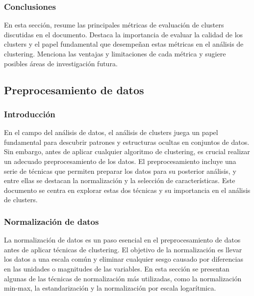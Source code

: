 \documentclass{article}
\begin{document}
\subsubsection*{Conclusiones}
En esta sección, resume las principales métricas de evaluación de clusters discutidas en el documento. Destaca la importancia de evaluar la calidad de los clusters y el papel fundamental que desempeñan estas métricas en el análisis de clustering. Menciona las ventajas y limitaciones de cada métrica y sugiere posibles áreas de investigación futura.

\subsection{Preprocesamiento de datos}

\subsubsection{Introducción}
En el campo del análisis de datos, el análisis de clusters juega un papel fundamental para descubrir patrones y estructuras ocultas en conjuntos de datos. Sin embargo, antes de aplicar cualquier algoritmo de clustering, es crucial realizar un adecuado preprocesamiento de los datos. El preprocesamiento incluye una serie de técnicas que permiten preparar los datos para su posterior análisis, y entre ellas se destacan la normalización y la selección de características. Este documento se centra en explorar estas dos técnicas y su importancia en el análisis de clusters.

\subsubsection{Normalización de datos}
La normalización de datos es un paso esencial en el preprocesamiento de datos antes de aplicar técnicas de clustering. El objetivo de la normalización es llevar los datos a una escala común y eliminar cualquier sesgo causado por diferencias en las unidades o magnitudes de las variables. En esta sección se presentan algunas de las técnicas de normalización más utilizadas, como la normalización min-max, la estandarización y la normalización por escala logarítmica.
\end{document}
